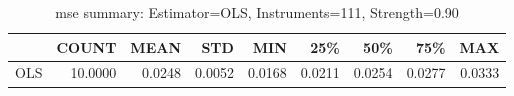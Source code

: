 \begin{table}[ht]
\centering
\caption{mse summary: Estimator=OLS, Instruments=111, Strength=0.90}
\begin{tabular}{lrrrrrrrr}
\toprule
 & COUNT & MEAN & STD & MIN & 25\% & 50\% & 75\% & MAX \\
\midrule
OLS & 10.0000 & 0.0248 & 0.0052 & 0.0168 & 0.0211 & 0.0254 & 0.0277 & 0.0333 \\
\bottomrule
\end{tabular}
\end{table}
